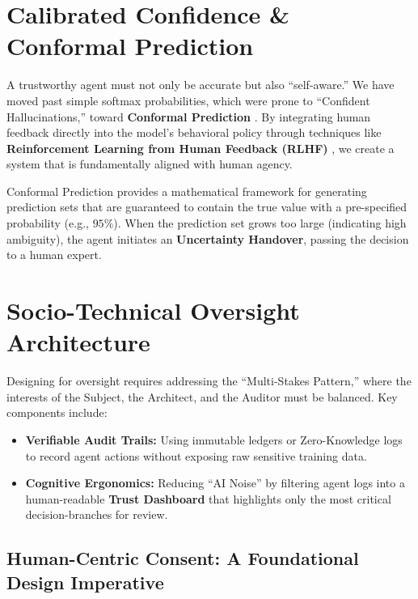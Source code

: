 \section{Calibrated Confidence \& Conformal Prediction}
\label{sec:uncertainty_handover}

A trustworthy agent must not only be accurate but also ``self-aware.'' We have moved past simple softmax probabilities, which were prone to ``Confident Hallucinations,'' toward \textbf{Conformal Prediction} \cite{ouyang2022}. By integrating human feedback directly into the model's behavioral policy through techniques like \textbf{Reinforcement Learning from Human Feedback (RLHF)} \cite{ouyang2022}, we create a system that is fundamentally aligned with human agency.

Conformal Prediction provides a mathematical framework for generating prediction sets that are guaranteed to contain the true value with a pre-specified probability (e.g., $95\%$). When the prediction set grows too large (indicating high ambiguity), the agent initiates an \textbf{Uncertainty Handover}, passing the decision to a human expert.

\section{Socio-Technical Oversight Architecture}
\label{sec:oversight_arch}

Designing for oversight requires addressing the ``Multi-Stakes Pattern,'' where the interests of the Subject, the Architect, and the Auditor must be balanced. Key components include:
\begin{itemize}
    \item \textbf{Verifiable Audit Trails:} Using immutable ledgers or Zero-Knowledge logs to record agent actions without exposing raw sensitive training data.
    \item \textbf{Cognitive Ergonomics:} Reducing ``AI Noise'' by filtering agent logs into a human-readable \textbf{Trust Dashboard} that highlights only the most critical decision-branches for review.
\end{itemize}

\subsection{Human-Centric Consent: A Foundational Design Imperative}
\label{sec:consent_foundations}

